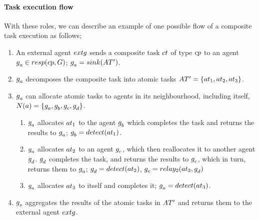 \paragraph{Task execution flow}
With these roles, we can describe an example of one possible flow of a composite task execution as follows;
\begin{enumerate}
	\item An external agent $\varExternalAgent{}{}$ sends a composite task $\varCompositeTask{}{}$ of type $\varCompositeTaskType{}{}$ to an agent $\varAgent{a}{} \in \functionTaskResponsibilities{}{}$; $\varAgent{a}{} = \functionSinkRole{}{}$.
	
	\item $g_{a}^{}$ decomposes the composite task into atomic tasks $\setAtomicTaskInstance{}{} = \lbrace \varAtomicTask{1}{}, \varAtomicTask{2}{}, \varAtomicTask{3}{} \rbrace$.
	
	\item $g_{a}^{}$ can allocate atomic tasks to agents in its neighbourhood, including itself, $\functionNeighbourhoodSignature{a}{} = \lbrace \varAgent{a}{}, \varAgent{b}{}, \varAgent{c}{}, \varAgent{d}{} \rbrace$.
	\begin{enumerate}
		\item $g_{a}^{}$ allocates $\varAtomicTask{1}{}$ to the agent $g_{b}^{}$ which completes the task and returns the results to $g_{a}^{}$; $\varAgent{b}{} = \functionDetectorRole{1}{}$.
		\item $g_{a}^{}$ allocates $\varAtomicTask{2}{}$ to an agent $g_{c}^{}$, which then reallocates it to another agent $g_{d}^{}$. $g_{d}^{}$ completes the task, and returns the results  to $g_{c}^{}$, which in turn, returns them to $g_{a}^{}$; $\varAgent{d}{} = \functionDetectorRole{2}{}$, $\varAgent{c}{} = \functionRelayRole{2}{2}{d}$
		\item $g_{a}^{}$ allocates $\varAtomicTask{3}{}$ to itself and completes it; $\varAgent{a}{} = \functionDetectorRole{3}{}$.
	\end{enumerate}
	
	\item $g_{s}^{}$ aggregates the results of the atomic tasks in $\setAtomicTaskInstance{}{}$ and returns them to the external agent $\varExternalAgent{}{}$.
\end{enumerate}

